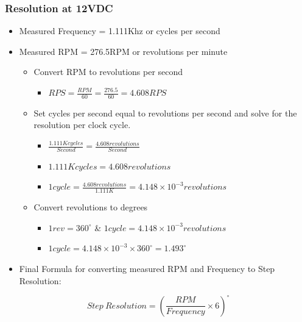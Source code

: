 \documentclass[main.tex]{subfiles}
\begin{document}
    \subsubsection{Resolution at 12VDC}

\begin{itemize}
    \item [] Measured Frequency = 1.111Khz or cycles per second
    \item [] Measured RPM = 276.5RPM or revolutions per minute
    \begin{itemize}
        \item [] Convert RPM to revolutions per second
        \begin{itemize}
            \item [] $RPS=\frac{RPM}{60}=\frac{276.5}{60}=4.608RPS$
        \end{itemize}
        \item[] Set cycles per second equal to revolutions per second and solve for the resolution per clock cycle. 
        \begin{itemize}
            \item [] $\frac{1.111Kcycles}{Second}= \frac{4.608revolutions}{Second}$
            \item[] $1.111Kcycles=4.608revolutions$
            \item[] $1cycle=\frac{4.608revolutions}{1.111K}=4.148\times 10^{-3}revolutions$
        \end{itemize}
        \item[] Convert revolutions to degrees
        \begin{itemize}
            \item [] $1rev=360^{\circ}$ \& $1cycle=4.148\times 10^{-3}revolutions$
            \item[] $1cycle=4.148\times 10^{-3}\times 360^{\circ}=1.493^{\circ}$
            
        \end{itemize}
    \end{itemize}
    \item[] Final Formula for converting measured RPM and Frequency to Step Resolution:
\end{itemize}

    \begin{equation}
    Step \ Resolution  = \left(\frac{RPM}{Frequency}\times 6 \right)^{\circ} 
    \end{equation}

\newpage
\end{document}
